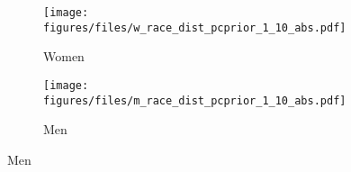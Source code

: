 \begin{figure}[htp]
\caption{Posterior Distribution $exp(\beta_m)$ and $exp(\beta_g)$
\newline Model \textit{Covariates}}
\centering

  \begin{subfigure}[b]{.80\linewidth}
    \centering
       \caption{Women}
    \texttt{[image: figures/files/w\_race\_dist\_pcprior\_1\_10\_abs.pdf]}
  \end{subfigure}%

 \begin{subfigure}[b]{.80\linewidth}
   \caption{Men}
    \centering
    \texttt{[image: figures/files/m\_race\_dist\_pcprior\_1\_10\_abs.pdf]}
  \end{subfigure}%
  \label{fig:race_abs}
\end{figure}